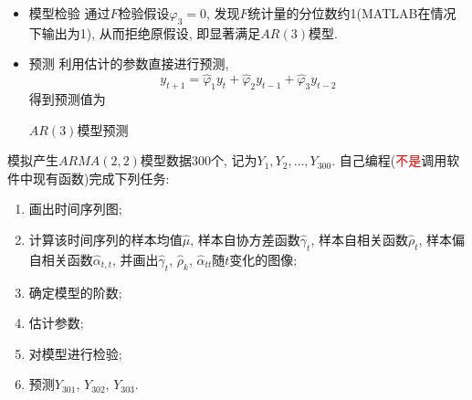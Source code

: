 \documentclass[chinese, lineno, watermark]{assignment}
\begin{document}
\begin{solution}
\begin{itemize}
\begin{table}[H]
            \end{table}
            \item{模型检验}
            通过$F$检验假设$\varphi_{3}=0$, 发现$F$统计量的分位数约1(MATLAB在情况下输出为1), 从而拒绝原假设, 即显著满足$AR(3)$模型.
            \item{预测}
            利用估计的参数直接进行预测,
            \begin{equation}
                y_{t+1} = \hat{\varphi}_{1}y_{t}+\hat{\varphi}_{2}y_{t-1}+\hat{\varphi}_{3}y_{t-2}
            \end{equation}
            得到预测值为
            \begin{table}[H]
                \begin{center}
                    \caption{$AR(3)$模型预测}
                \end{center}
            \end{table}
        \end{itemize}
    \end{solution}

    \clearpage

    \begin{problem}
        模拟产生$ARMA(2, 2)$模型数据300个, 记为$Y_{1}, Y_{2}, \dotsc, Y_{300}$. 自己编程(\textcolor{red}{不是}调用软件中现有函数)完成下列任务:
        \begin{enumerate}[(1)]
            \item 画出时间序列图;
            \item 计算该时间序列的样本均值$\hat{\mu}$, 样本自协方差函数$\hat{\gamma}_{t}$, 样本自相关函数$\hat{\rho}_{t}$, 样本偏自相关函数$\hat{\alpha}_{t, t}$, 并画出$\hat{\gamma}_{t}$, $\hat{\rho}_{k}$, $\hat{\alpha}_{tt}$随$t$变化的图像;
            \item 确定模型的阶数;
            \item 估计参数;
            \item 对模型进行检验;
            \item 预测$Y_{301}$, $Y_{302}$, $Y_{303}$.
        \end{enumerate}
    \end{problem}
\end{document}
